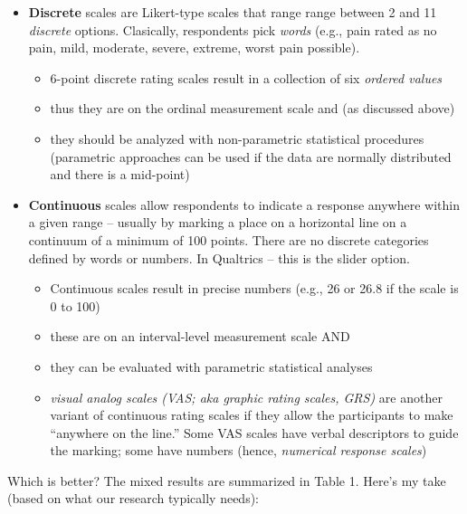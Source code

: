 \documentclass[
  english,
]{book}
\providecommand{\tightlist}{%
  \setlength{\itemsep}{0pt}\setlength{\parskip}{0pt}}
\begin{document}
\begin{itemize}
\tightlist
\item
  \textbf{Discrete} scales are Likert-type scales that range range between 2 and 11 \emph{discrete} options. Clasically, respondents pick \emph{words} (e.g., pain rated as no pain, mild, moderate, severe, extreme, worst pain possible).

  \begin{itemize}
  \tightlist
  \item
    6-point discrete rating scales result in a collection of six \emph{ordered values}
  \item
    thus they are on the ordinal measurement scale and (as discussed above)
  \item
    they should be analyzed with non-parametric statistical procedures (parametric approaches can be used if the data are normally distributed and there is a mid-point)
  \end{itemize}
\item
  \textbf{Continuous} scales allow respondents to indicate a response anywhere within a given range -- usually by marking a place on a horizontal line on a continuum of a minimum of 100 points. There are no discrete categories defined by words or numbers. In Qualtrics -- this is the slider option.

  \begin{itemize}
  \tightlist
  \item
    Continuous scales result in precise numbers (e.g., 26 or 26.8 if the scale is 0 to 100)
  \item
    these are on an interval-level measurement scale AND
  \item
    they can be evaluated with parametric statistical analyses
  \item
    \emph{visual analog scales (VAS; aka graphic rating scales, GRS)} are another variant of continuous rating scales if they allow the participants to make ``anywhere on the line.'' Some VAS scales have verbal descriptors to guide the marking; some have numbers (hence, \emph{numerical response scales})
  \end{itemize}
\end{itemize}

Which is better? The mixed results are summarized in Table 1. Here's my take (based on what our research typically needs):
\end{document}
